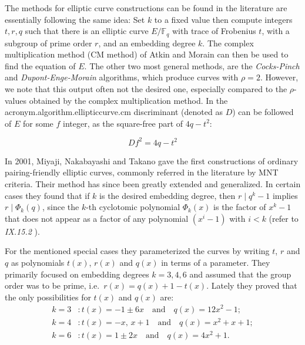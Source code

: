 The methods for elliptic curve constructions can be found in the literature are essentially following the same idea: Set $k$ to a fixed value then compute integers $t, r, q$ such that there is an elliptic curve $E/\mathbb{F}_q$ with trace of Frobenius $t$, with a subgroup of prime order $r$, and an embedding degree $k$. The complex multiplication method (CM method) of Atkin and Morain \cite{AM93} can then be used to find the equation of $E$. 
The other two most general methods, are the \textit{Cocks-Pinch} \cite{CP01} and \textit{Dupont-Enge-Morain} \cite{DEM05} algorithms, which produce curves with $\rho=2$. However, we note that this output often not the desired one,  especially compared to the $\rho$-values obtained by the complex multiplication method. 
In  the \acs{acronym.algorithm.ellipticcurve.cm} discriminant (denoted as $D$) can be followed  of $E$ for some $f$ integer,  as the square-free part of $4q - t^2$:

\begin{equation}
	Df^2 = 4q - t^2
	\label{eq:cmmethoddistriminant}
\end{equation}


In 2001, Miyaji, Nakabayashi and Takano \cite{MNT01} gave the first constructions of ordinary pairing-friendly elliptic curves, commonly referred in the literature by MNT criteria.  Their method has since been greatly extended and generalized.  In certain cases they found that if $k$ is the desired embedding degree, then $r \mid q^k - 1$ implies $r \mid \Phi_k(q)$, since the $k$-th cyclotomic polynomial $\Phi_k(x)$ is the factor of $x^k - 1$ that does not appear as a factor of any polynomial $(x^i - 1)$ with $i < k$  (refer to \textit{IX.15.2} \cite{Gal05}).

For the mentioned special cases they parameterized the curves by writing $t$, $r$ and $q$ as polynomials $t(x)$, $r(x)$ and $q(x)$ in terms of a parameter. They primarily focused on embedding degrees $k = 3, 4, 6$ and assumed that the group order was to be prime, i.e.\ $r(x) = q(x) + 1 - t(x)$. Lately they proved that the only possibilities for $t(x)$ and $q(x)$ are:
\begin{align*}
	k = 3 &: t(x) = -1 \pm 6x \quad \text{and} \quad q(x) = 12x^2 - 1;\\
	k = 4 &: t(x) = -x,\, x+1 \quad \text{and} \quad q(x) = x^2 + x + 1;\\
	k = 6 &: t(x) = 1 \pm 2x \quad \text{and} \quad q(x) = 4x^2 + 1.
\end{align*}

